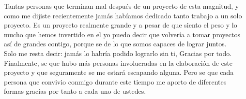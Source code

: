 Tantas personas que terminan mal después de un proyecto de esta magnitud, y como me dijiste recientemente jamás habíamos dedicado tanto trabajo a un solo proyecto. Es un proyecto realmente grande y a pesar de que siento el peso y lo mucho que hemos invertido en el yo puedo decir que volvería a tomar proyectos así de grandes contigo, porque se de lo que somos capaces de lograr juntos.\\
Solo me resta decir: jamás lo habría podido lograrlo sin ti, Gracias por todo. \\
Finalmente, se que hubo más personas involucradas en la elaboración de este proyecto y que seguramente se me estará escapando alguna. Pero se que cada persona que convivio conmigo durante este tiempo me aporto de diferentes formas gracias por tanto a cada uno de ustedes.\\

